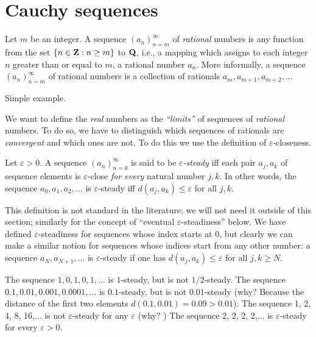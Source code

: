 \section{Cauchy sequences}

\begin{definition} [Sequences]  \label{def 5.1.1}
Let \(m\) be an integer.
A sequence \((a_n)_{n = m}^{\infty}\) of \emph{rational} numbers is any function from the set \( \{n \in \mathbf{Z} : n \ge m\} \) to \(\mathbf{Q}\),
i.e., a mapping which assigns to each integer \(n\) greater than or equal to \(m\), a rational number \(a_n\).
More informally, a sequence \((a_n)_{n = m}^{\infty}\)
of rational numbers is a collection of rationals \(a_m, a_{m + 1}, a_{m + 2},...\)
\end{definition}

\begin{example}
Simple example.
\end{example}

We want to define the \emph{real} numbers as the \emph{``limits''} of sequences of \emph{rational} numbers.
To do so, we have to distinguish which sequences of rationals are \emph{convergent} and which ones are not.
To do this we use the definition of  \(\varepsilon\)-closeness.

\begin{definition}  \label{def 5.1.3}
Let \(\varepsilon > 0\).
A sequence \((a_n)_{n = 0}^{\infty}\) is said to be \emph{\(\varepsilon\)-steady} iff each pair \(a_j, a_k\) of sequence elements is \(\varepsilon\)-close \emph{for every} natural number \(j, k\).
In other words, the sequence \(a_0, a_1, a_2,...\) is \(\varepsilon\)-steady iff \(d(a_j, a_k) \le \varepsilon\) for all \(j, k\).
\end{definition}

\begin{remark} \label{remark 5.1.4}
This definition is not standard in the literature;
we will not need it outside of this section;
similarly for the concept of ``eventual \(\varepsilon\)-steadiness'' below.
We have defined \(\varepsilon\)-steadiness for sequences whose index starts at \(0\), but clearly we can make a similar notion for sequences whose indices start from any other number:
a sequence \(a_N, a_{N + 1}, ...\) is \(\varepsilon\)-steady if one has \(d(a_j, a_k) \le \varepsilon\) for all \(j, k \ge N\).
\end{remark}

\begin{example} \label{example 5.1.5}
The sequence \(1, 0, 1, 0, 1,...\) is \(1\)-steady, but is not \(1/2\)-steady.
The sequence \(0.1, 0.01, 0.001, 0.0001,...\) is \(0.1\)-steady, but is not \(0.01\)-steady (why? Because the distance of the first two elements \(d(0.1, 0.01) = 0.09 > 0.01\)).
The sequence 1, 2, 4, 8, 16,... is not \(\varepsilon\)-steady for any \(\varepsilon\) (why? )
The sequence 2, 2, 2, 2,... is \(\varepsilon\)-steady for every \(\varepsilon > 0\).
\end{example}

